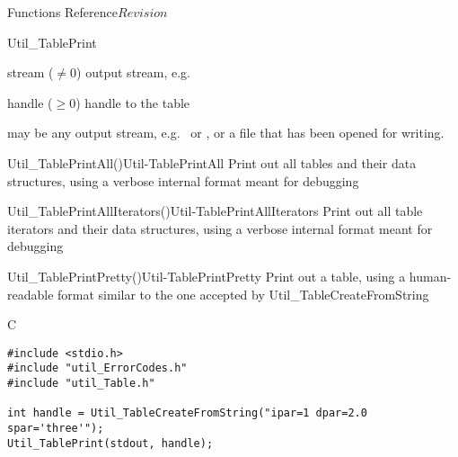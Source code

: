 \begin{cactuspart}{ Functions Reference}{}{$Revision$}
\begin{FunctionDescription}{Util\_TablePrint}
\begin{ParameterSection}
\begin{Parameter}{stream ($\ne 0$)}
output stream, e.g.\ 
\end{Parameter}
\begin{Parameter}{handle ($\ge 0$)}
handle to the table
\end{Parameter}
\end{ParameterSection}

\begin{Discussion}
 may be any output stream, e.g.\  or
, or a file that has been opened for writing.
\end{Discussion}

\begin{SeeAlsoSection}
\begin{SeeAlso2}{Util\_TablePrintAll()}{Util-TablePrintAll}
Print out all tables and their data structures, using a verbose
internal format meant for debugging
\end{SeeAlso2}
\begin{SeeAlso2}{Util\_TablePrintAllIterators()}{Util-TablePrintAllIterators}
Print out all table iterators and their data structures, using a
verbose internal format meant for debugging
\end{SeeAlso2}
\begin{SeeAlso2}{Util\_TablePrintPretty()}{Util-TablePrintPretty}
Print out a table, using a human-readable format similar to the one
accepted by Util\_TableCreateFromString
\end{SeeAlso2}
\end{SeeAlsoSection}


\begin{ExampleSection}
\begin{Example}{C}
\begin{verbatim}
#include <stdio.h>
#include "util_ErrorCodes.h"
#include "util_Table.h"

int handle = Util_TableCreateFromString("ipar=1 dpar=2.0 spar='three'");
Util_TablePrint(stdout, handle);
\end{verbatim}
\end{Example}
\end{ExampleSection}
\end{FunctionDescription}



\end{cactuspart}
